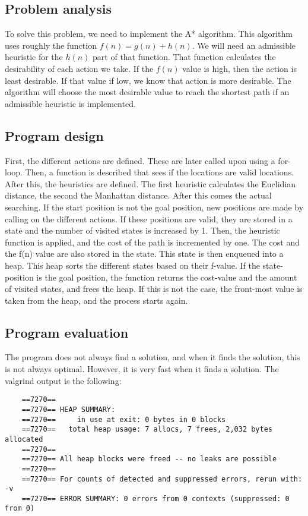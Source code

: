 \documentclass{article}
\begin{document}
	\subsection*{Problem analysis}
	To solve this problem, we need to implement the A* algorithm. This algorithm uses roughly the function $f(n) = g(n) + h(n)$. We will need an admissible heuristic for the $h(n)$ part of that function. That function calculates the desirability of each action we take. If the $f(n)$ value is high, then the action is least desirable. If that value if low, we know that action is more desirable. The algorithm will choose the most desirable value to reach the shortest path if an admissible heuristic is implemented.
	
	\subsection*{Program design}
	
	First, the different actions are defined. These are later called upon using a for-loop. Then, a function is described that sees if the locations are valid locations. After this, the heuristics are defined. The first heuristic calculates the Euclidian distance, the second the Manhattan distance. After this comes the actual searching. If the start position is not the goal position, new positions are made by calling on the different actions. If these positions are valid, they are stored in a state and the number of visited states is increased by 1. Then, the heuristic function is applied, and the cost of the path is incremented by one. The cost and the f(n) value are also stored in the state. This state is then enqueued into a heap. This heap sorts the different states based on their f-value. If the state-position is the goal position, the function returns the cost-value and the amount of visited states, and frees the heap. If this is not the case, the front-most value is taken from the heap, and the process starts again.
	
	\subsection*{Program evaluation}
	
	The program does not always find a solution, and when it finds the solution, this is not always optimal. However, it is very fast when it finds a solution. 	
	The valgrind output is the following:
	
	\begin{lstlisting}
	==7270== 
	==7270== HEAP SUMMARY:
	==7270==     in use at exit: 0 bytes in 0 blocks
	==7270==   total heap usage: 7 allocs, 7 frees, 2,032 bytes allocated
	==7270== 
	==7270== All heap blocks were freed -- no leaks are possible
	==7270== 
	==7270== For counts of detected and suppressed errors, rerun with: -v
	==7270== ERROR SUMMARY: 0 errors from 0 contexts (suppressed: 0 from 0)
	
	\end{lstlisting}
	
\end{document}
